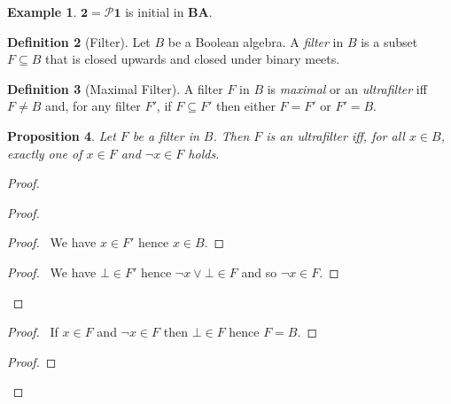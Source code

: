 \documentclass{book}
\let\qed\relax
\newtheorem{prop}{Proposition}[chapter]
\theoremstyle{definition}
\newtheorem{df}[prop]{Definition}
\newtheorem{ex}[prop]{Example}
\begin{document}
\begin{ex}
$\mathbf{2} = \mathcal{P} \mathbf{1}$ is initial in $\mathbf{BA}$.
\end{ex}

\begin{df}[Filter]
Let $B$ be a Boolean algebra. A \emph{filter} in $B$ is a subset $F \subseteq B$ that is closed upwards and closed under binary meets.
\end{df}

\begin{df}[Maximal Filter]
A filter $F$ in $B$ is \emph{maximal} or an \emph{ultrafilter} iff $F \neq B$ and, for any filter $F'$, if $F \subseteq F'$ then either $F = F'$ or $F' = B$.
\end{df}

\begin{prop}
Let $F$ be a filter in $B$. Then $F$ is an ultrafilter iff, for all $x \in B$, exactly one of $x \in F$ and $\neg x \in F$ holds.
\end{prop}

\begin{proof}
\pf
{}
\begin{proof}
	\begin{proof}
		\pf\ We have $x \in F'$ hence $x \in B$.
	\end{proof}
	\begin{proof}
		\pf\ We have $\bot \in F'$ hence $\neg x \vee \bot \in F$ and so $\neg x \in F$.
	\end{proof}
\end{proof}
\begin{proof}
	\pf\ If $x \in F$ and $\neg x \in F$ then $\bot \in F$ hence $F = B$.
\end{proof}
\begin{proof}
\end{proof}
\qed
\end{proof}
\end{document}
